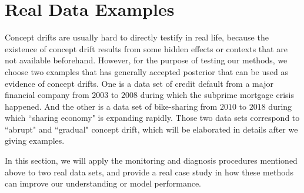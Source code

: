 \documentclass[twoside,11pt]{article}
\begin{document}
\section{Real Data Examples}
\label{s:real_data}
Concept drifts are usually hard to directly testify in real life, because the existence of concept drift results from some hidden effects or contexts that are not available beforehand. However, for the purpose of testing our methods, we choose two examples that has generally accepted posterior that can be used as evidence of concept drifts. One is a data set of credit default from a major financial company from $2003$ to $2008$ during which the subprime mortgage crisis happened. And the other is a data set of bike-sharing from $2010$ to $2018$ during which ``sharing economy" is expanding rapidly. Those two data sets correspond to ``abrupt" and ``gradual" concept drift, which will be elaborated in details after we giving examples.

In this section, we will apply the monitoring and diagnosis procedures mentioned above to two real data sets, and provide a real case study in how these methods can improve our understanding or model performance.
\end{document}

